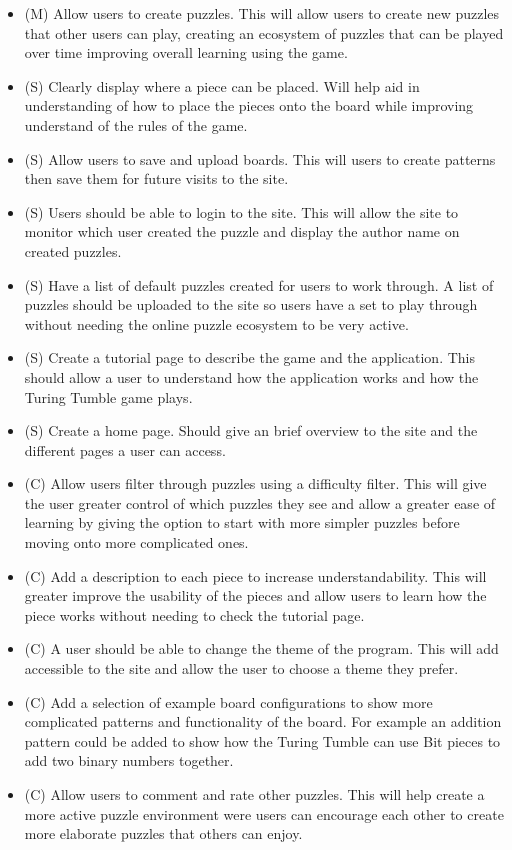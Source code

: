 \documentclass{l4proj}
\begin{document}
\begin{itemize}
    \item (M) Allow users to create puzzles. This will allow users to create new puzzles that other users can play, creating an ecosystem of puzzles that can be played over time improving overall learning using the game.
    \item (S) Clearly display where a piece can be placed. Will help aid in understanding of how to place the pieces onto the board while improving understand of the rules of the game. 
    \item (S) Allow users to save and upload boards. This will users to create patterns then save them for future visits to the site.
    \item (S) Users should be able to login to the site. This will allow the site to monitor which user created the puzzle and display the author name on created puzzles. 
    \item (S) Have a list of default puzzles created for users to work through. A list of puzzles should be uploaded to the site so users have a set to play through without needing the online puzzle ecosystem to be very active.
    \item (S) Create a tutorial page to describe the game and the application. This should allow a user to understand how the application works and how the Turing Tumble game plays.
    \item (S) Create a home page. Should give an brief overview to the site and the different pages a user can access.
    \item (C) Allow users filter through puzzles using a difficulty filter. This will give the user greater control of which puzzles they see and allow a greater ease of learning by giving the option to start with more simpler puzzles before moving onto more complicated ones.
    \item (C) Add a description to each piece to increase understandability. This will greater improve the usability of the pieces and allow users to learn how the piece works without needing to check the tutorial page. 
    \item (C) A user should be able to change the theme of the program. This will add accessible to the site and allow the user to choose a theme they prefer.
    \item (C) Add a selection of example board configurations to show more complicated patterns and functionality of the board. For example an addition pattern could be added to show how the Turing Tumble can use Bit pieces to add two binary numbers together.
    \item (C) Allow users to comment and rate other puzzles. This will help create a more active puzzle environment were users can encourage each other to create more elaborate puzzles that others can enjoy.

\end{itemize}
\end{document}
